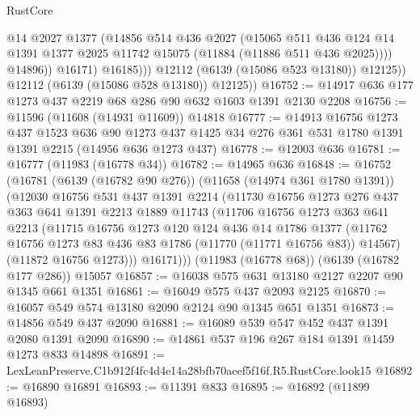 \begin{lexlean}{RustCore}
\begin{coremodule}
                        @14
                        @2027
                        @1377
                        (@14856
                          @514
                          @436
                          @2027
                          (@15065
                            @511
                            @436
                            @124
                            @14
                            @1391
                            @1377
                            @2025
                            @11742
                            @15075
                            (@11884 (@11886 @511 @436 @2025))))
                        @14896))
                    @16171)
                  @16185)))
            @12112
            (@6139 (@15086 @523 @13180))
            @12125))
        @12112
        (@6139 (@15086 @528 @13180))
        @12125))
@16752 := @14917 @636 @177 @1273 @437 @2219 @68 @286 @90 @632 @1603 @1391 @2130 @2208
@16756 := @11596 (@11608 (@14931 @11609)) @14818
@16777 := @14913
    @16756
    @1273
    @437
    @1523
    @636
    @90
    @1273
    @437
    @1425
    @34
    @276
    @361
    @531
    @1780
    @1391
    @1391
    @2215
    (@14956 @636 @1273 @437)
@16778 := @12003 @636
@16781 := @16777 (@11983 (@16778 @34))
@16782 := @14965 @636
@16848 := @16752
    (@16781
      (@6139 (@16782 @90 @276))
      (@11658 (@14974 @361 @1780 @1391))
      (@12030
        @16756
        @531
        @437
        @1391
        @2214
        (@11730
          @16756
          @1273
          @276
          @437
          @363
          @641
          @1391
          @2213
          @1889
          @11743
          (@11706
            @16756
            @1273
            @363
            @641
            @2213
            (@11715
              @16756
              @1273
              @120
              @124
              @436
              @14
              @1786
              @1377
              (@11762 @16756 @1273 @83 @436 @83 @1786 (@11770 (@11771 @16756 @83)) @14567)
              (@11872 @16756 @1273)))
          @16171)))
    (@11983 (@16778 @68))
    (@6139 (@16782 @177 @286))
    @15057
@16857 := @16038 @575 @631 @13180 @2127 @2207 @90 @1345 @661 @1351
@16861 := @16049 @575 @437 @2093 @2125
@16870 := @16057 @549 @574 @13180 @2090 @2124 @90 @1345 @651 @1351
@16873 := @14856 @549 @437 @2090
@16881 := @16089 @539 @547 @452 @437 @1391 @2080 @1391 @2090
@16890 := @14861 @537 @196 @267 @184 @1391 @1459 @1273 @833 @14898
@16891 := LexLeanPreserve.C1b912f4fc4d4e14a28bfb70aeef5f16f.R5.RustCore.look15
@16892 := @16890 @16891
@16893 := @11391 @833
@16895 := @16892 (@11899 @16893)

\end{coremodule}
\end{lexlean}
